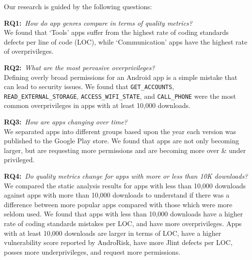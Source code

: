 \documentclass{sig-alternate}
\begin{document}
Our research is guided by the following questions:

\textbf{RQ1:}~\emph{How do app genres compare in terms of quality metrics?}\\
We found that `Tools' apps suffer from the highest rate of coding standards defects per line of code (LOC), while `Communication' apps have the highest rate of overprivileges.


\textbf{RQ2:}~\emph{What are the most pervasive overprivileges?}\\
Defining overly broad permissions for an Android app is a simple mistake that can lead to security issues. We found that \texttt{GET\_ACCOUNTS}, \texttt{READ\_EXTERNAL\_STORAGE}, \texttt{ACCESS\_WIFI\_STATE}, and \newline \texttt{CALL\_PHONE} were the most common overprivileges in apps with at least 10,000 downloads.



\textbf{RQ3:}~\emph{How are apps changing over time?}\\
We separated apps into different groups based upon the year each version was published to the Google Play store. We found that apps are not only becoming larger, but are requesting more permissions and are becoming more over \& under privileged.


\textbf{RQ4:}~\emph{Do quality metrics change for apps with more or less than 10K downloads?}\\
We compared the static analysis results for apps with less than 10,000 downloads against apps with more than 10,000 downloads to understand if there was a difference between more popular apps compared with those which were more seldom used. We found that apps with less than 10,000 downloads have a higher rate of coding standards mistakes per LOC, and have more overprivileges. Apps with at least 10,000 downloads are larger in terms of LOC, have a higher vulnerability score reported by AndroRisk, have more Jlint defects per LOC, posses more underprivileges, and request more permissions.
\end{document}
